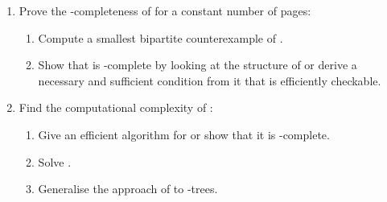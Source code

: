 \begin{enumerate}
\item Prove the \NP-completeness of \probBook for a constant number of pages:
\begin{enumerate}
\item Compute a smallest bipartite counterexample of \probThreeMatching.
\item Show that \probThreeMatching is \NP-complete by looking at the structure of  or derive a necessary and sufficient condition from it
that is efficiently checkable.
\end{enumerate}

\item Find the computational complexity of \probPTree:
\begin{enumerate}
\item Give an efficient algorithm for \probMul or show that it is \NP-complete.
\item Solve \SEFECON.
\item Generalise the approach of  to \PT-trees.
\end{enumerate}
\end{enumerate}